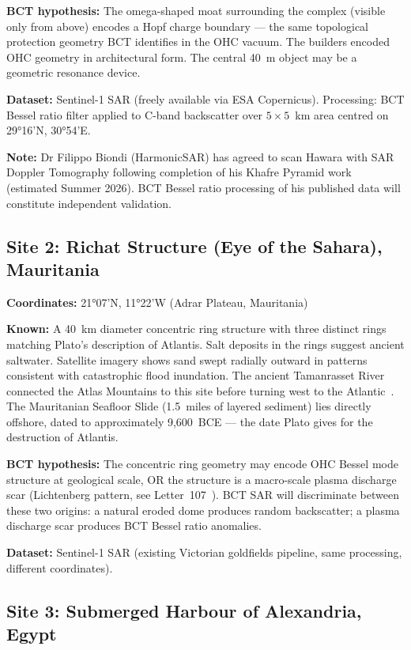 \documentclass[12pt,twocolumn]{article}
\begin{document}
\textbf{BCT hypothesis:} The omega-shaped moat surrounding
the complex (visible only from above) encodes a Hopf charge
boundary --- the same topological protection geometry BCT
identifies in the OHC vacuum. The builders encoded OHC geometry
in architectural form. The central 40~m object may be a
geometric resonance device.

\textbf{Dataset:} Sentinel-1 SAR (freely available via ESA
Copernicus). Processing: BCT Bessel ratio filter applied to
C-band backscatter over $5 \times 5$~km area centred on
29°16'N, 30°54'E.

\textbf{Note:} Dr Filippo Biondi (HarmonicSAR) has agreed to
scan Hawara with SAR Doppler Tomography following completion
of his Khafre Pyramid work (estimated Summer 2026). BCT Bessel
ratio processing of his published data will constitute
independent validation.

\subsection{Site 2: Richat Structure (Eye of the Sahara),
Mauritania}

\textbf{Coordinates:} 21°07'N, 11°22'W (Adrar Plateau,
Mauritania)

\textbf{Known:} A 40~km diameter concentric ring structure
with three distinct rings matching Plato's description of
Atlantis. Salt deposits in the rings suggest ancient saltwater.
Satellite imagery shows sand swept radially outward in patterns
consistent with catastrophic flood inundation. The ancient
Tamanrasset River connected the Atlas Mountains to this site
before turning west to the Atlantic~\cite{Richat2025}.
The Mauritanian Seafloor Slide (1.5~miles of layered sediment)
lies directly offshore, dated to approximately 9,600~BCE ---
the date Plato gives for the destruction of Atlantis.

\textbf{BCT hypothesis:} The concentric ring geometry may
encode OHC Bessel mode structure at geological scale, OR
the structure is a macro-scale plasma discharge scar
(Lichtenberg pattern, see Letter~107~\cite{BCT_L107}).
BCT SAR will discriminate between these two origins: a
natural eroded dome produces random backscatter; a plasma
discharge scar produces BCT Bessel ratio anomalies.

\textbf{Dataset:} Sentinel-1 SAR (existing Victorian goldfields
pipeline, same processing, different coordinates).

\subsection{Site 3: Submerged Harbour of Alexandria, Egypt}
\end{document}
